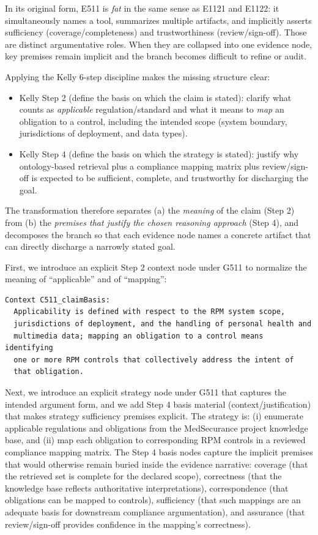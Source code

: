 \documentclass{article}
\begin{document}
In its original form, E511 is \emph{fat} in the same sense as E1121 and E1122: it simultaneously names a tool, summarizes multiple artifacts, and implicitly asserts sufficiency (coverage/completeness) and trustworthiness (review/sign-off). Those are distinct argumentative roles. When they are collapsed into one evidence node, key premises remain implicit and the branch becomes difficult to refine or audit.

Applying the Kelly 6-step discipline makes the missing structure clear:

\begin{itemize}
\item Kelly Step 2 (define the basis on which the claim is stated): clarify what counts as \emph{applicable} regulation/standard and what it means to \emph{map} an obligation to a control, including the intended scope (system boundary, jurisdictions of deployment, and data types).
\item Kelly Step 4 (define the basis on which the strategy is stated): justify why ontology-based retrieval plus a compliance mapping matrix plus review/sign-off is expected to be sufficient, complete, and trustworthy for discharging the goal.
\end{itemize}

The transformation therefore separates (a) the \emph{meaning} of the claim (Step 2) from (b) the \emph{premises that justify the chosen reasoning approach} (Step 4), and decomposes the branch so that each evidence node names a concrete artifact that can directly discharge a narrowly stated goal.

First, we introduce an explicit Step 2 context node under G511 to normalize the meaning of ``applicable'' and of ``mapping'':

\begin{verbatim}
Context C511_claimBasis:
  Applicability is defined with respect to the RPM system scope,
  jurisdictions of deployment, and the handling of personal health and
  multimedia data; mapping an obligation to a control means identifying
  one or more RPM controls that collectively address the intent of
  that obligation.
\end{verbatim}

Next, we introduce an explicit strategy node under G511 that captures the intended argument form, and we add Step 4 basis material (context/justification) that makes strategy sufficiency premises explicit. The strategy is: (i) enumerate applicable regulations and obligations from the MedSecurance project knowledge base, and (ii) map each obligation to corresponding RPM controls in a reviewed compliance mapping matrix. The Step 4 basis nodes capture the implicit premises that would otherwise remain buried inside the evidence narrative: coverage (that the retrieved set is complete for the declared scope), correctness (that the knowledge base reflects authoritative interpretations), correspondence (that obligations can be mapped to controls), sufficiency (that such mappings are an adequate basis for downstream compliance argumentation), and assurance (that review/sign-off provides confidence in the mapping’s correctness).
\end{document}
